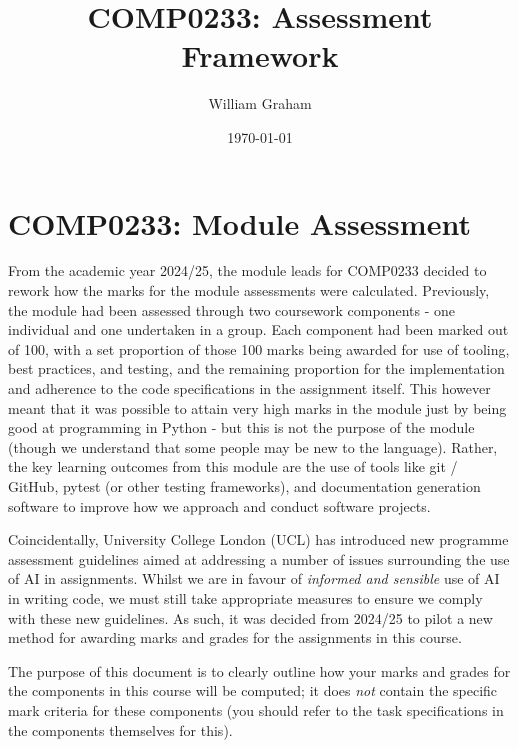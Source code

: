 \documentclass[10pt, a4paper]{article}
\title{COMP0233: Assessment Framework}
\author{William Graham}
\date{\today}
\begin{document}
\maketitle

\tableofcontents

\hypersetup{
  linkcolor = magenta,
}





\section{COMP0233: Module Assessment}

From the academic year 2024/25, the module leads for COMP0233 decided to rework how the marks for the module assessments were calculated.
Previously, the module had been assessed through two coursework components - one individual and one undertaken in a group.
Each component had been marked out of 100, with a set proportion of those 100 marks being awarded for use of tooling, best practices, and testing, and the remaining proportion for the implementation and adherence to the code specifications in the assignment itself.
This however meant that it was possible to attain very high marks in the module just by being good at programming in Python - but this is not the purpose of the module (though we understand that some people may be new to the language).
Rather, the key learning outcomes from this module are the use of tools like git / GitHub, pytest (or other testing frameworks), and documentation generation software to improve how we approach and conduct software projects.

Coincidentally, University College London (UCL) has introduced new programme assessment guidelines aimed at addressing a number of issues surrounding the use of AI in assignments.
Whilst we are in favour of \textit{informed and sensible} use of AI in writing code, we must still take appropriate measures to ensure we comply with these new guidelines.
As such, it was decided from 2024/25 to pilot a new method for awarding marks and grades for the assignments in this course.

The purpose of this document is to clearly outline how your marks and grades for the components in this course will be computed; it does \textit{not} contain the specific mark criteria for these components (you should refer to the task specifications in the components themselves for this).
\end{document}
